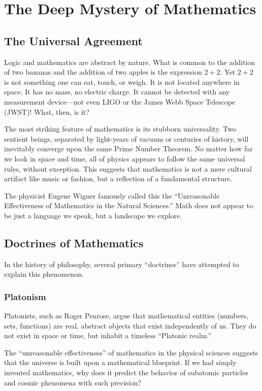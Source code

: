 \chapter{The Deep Mystery of Mathematics}
\label{chap:doctrines-of-math}

\section{The Universal Agreement}

Logic and mathematics are abstract by nature.
What is common to the addition of two bananas and the addition of two apples is the expression $2+2$.
Yet $2+2$ is not something one can eat, touch, or weigh. It is not located anywhere in space.
It has no mass, no electric charge.
It cannot be detected with any measurement device---not even LIGO or the James Webb Space Telescope (JWST)! What, then, is it?

The most striking feature of mathematics is its stubborn universality.
Two sentient beings, separated by light-years of vacuum or centuries of history, will inevitably converge upon the same Prime Number Theorem.
No matter how far we look in space and time, all of physics appears to follow the same universal rules, without exception.
This suggests that mathematics is not a mere cultural artifact like music or fashion, but a reflection of a fundamental structure.

The physicist Eugene Wigner famously called this the ``Unreasonable Effectiveness of Mathematics in the Natural Sciences.''
Math does not appear to be just a language we speak, but a landscape we explore.

\section{Doctrines of Mathematics}

In the history of philosophy, several primary ``doctrines'' have attempted to explain this phenomenon.

\subsection*{Platonism}

Platonists, such as Roger Penrose, argue that mathematical entities (numbers, sets, functions) are real, abstract objects that exist independently of us.
They do not exist in space or time, but inhabit a timeless ``Platonic realm.''

The ``unreasonable effectiveness'' of mathematics in the physical sciences suggests that the universe is built upon a mathematical blueprint.
If we had simply invented mathematics, why does it predict the behavior of subatomic particles and cosmic phenomena with such precision?

